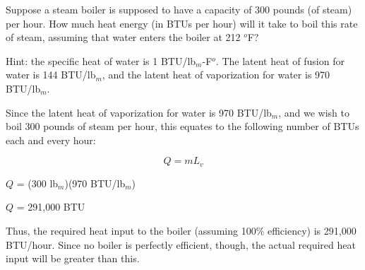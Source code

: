 

Suppose a steam boiler is supposed to have a capacity of 300 pounds (of steam) per hour.  How much heat energy (in BTUs per hour) will it take to boil this rate of steam, assuming that water enters the boiler at 212 $^{o}$F?

\vskip 10pt

Hint: the specific heat of water is 1 BTU/lb$_{m}$-F$^{o}$.  The latent heat of fusion for water is 144 BTU/lb$_{m}$, and the latent heat of vaporization for water is 970 BTU/lb$_{m}$.







Since the latent heat of vaporization for water is 970 BTU/lb$_{m}$, and we wish to boil 300 pounds of steam per hour, this equates to the following number of BTUs each and every hour:

$$Q = m L_v$$

$Q$ = (300 lb$_{m}$)(970 BTU/lb$_{m}$)

\vskip 10pt

$Q$ = 291,000 BTU

\vskip 10pt

Thus, the required heat input to the boiler (assuming 100\% efficiency) is 291,000 BTU/hour.  Since no boiler is perfectly efficient, though, the actual required heat input will be greater than this.











